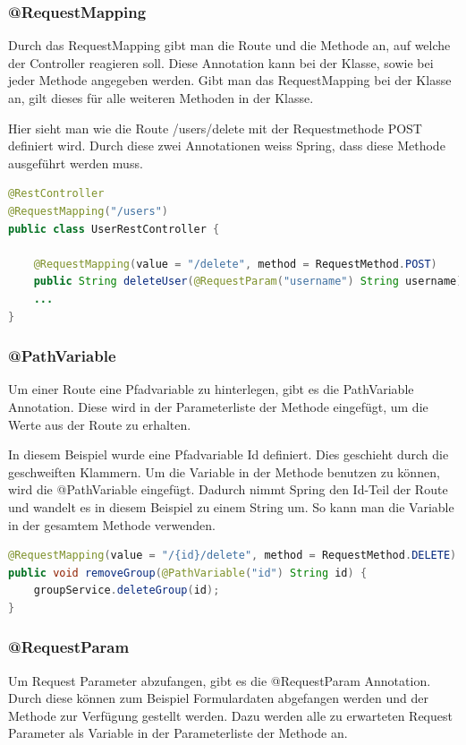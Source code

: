\subsubsection{@RequestMapping}
Durch das RequestMapping gibt man die Route und die Methode an, auf welche der Controller reagieren soll. Diese Annotation kann bei der Klasse, sowie bei jeder Methode angegeben werden. Gibt man das RequestMapping bei der Klasse an, gilt dieses für alle weiteren Methoden in der Klasse.

Hier sieht man wie die Route /users/delete mit der Requestmethode POST definiert wird. Durch diese zwei Annotationen weiss Spring, dass diese Methode ausgeführt werden muss.
\begin{lstlisting}[language=java]
@RestController
@RequestMapping("/users")
public class UserRestController {

	@RequestMapping(value = "/delete", method = RequestMethod.POST)
	public String deleteUser(@RequestParam("username") String username) {}
	...
}
\end{lstlisting}
\subsubsection{@PathVariable}
Um einer Route eine Pfadvariable zu hinterlegen, gibt es die PathVariable Annotation. Diese wird in der Parameterliste der Methode eingefügt, um die Werte aus der Route zu erhalten.

In diesem Beispiel wurde eine Pfadvariable Id definiert. Dies geschieht durch die geschweiften Klammern. Um die Variable in der Methode benutzen zu können, wird die @PathVariable eingefügt. Dadurch nimmt Spring den Id-Teil der Route und wandelt es in diesem Beispiel zu einem String um. So kann man die Variable in der gesamtem Methode verwenden.
\begin{lstlisting}[language=java]
@RequestMapping(value = "/{id}/delete", method = RequestMethod.DELETE)
public void removeGroup(@PathVariable("id") String id) {
	groupService.deleteGroup(id);
}
\end{lstlisting}
\subsubsection{@RequestParam}
Um Request Parameter abzufangen, gibt es die @RequestParam Annotation. Durch diese können zum Beispiel Formulardaten abgefangen werden und der Methode zur Verfügung gestellt werden. Dazu werden alle zu erwarteten Request Parameter als Variable in der Parameterliste der Methode an.

